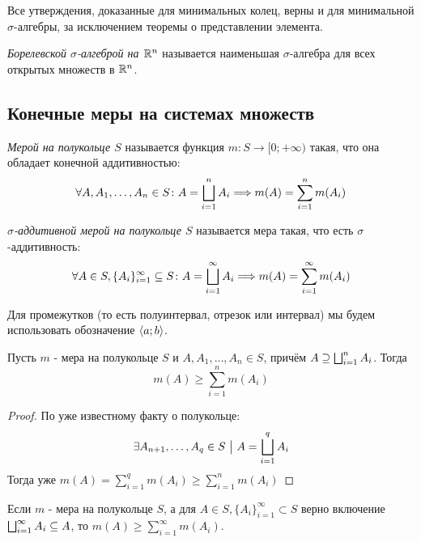 \begin{note}
	Все утверждения, доказанные для минимальных колец, верны и для минимальной $\sigma$-алгебры, за исключением теоремы о представлении элемента.
\end{note}

\begin{definition}
	\textit{Борелевской $\sigma$-алгеброй на $\mathbb{R}^n$} называется наименьшая $\sigma$-алгебра для всех открытых множеств в $\mathbb{R}^n$.
\end{definition}

\subsection{Конечные меры на системах множеств}

\begin{definition}
	\textit{Мерой на полукольце $S$} называется функция $m \colon S \to [0; +\infty)$ такая, что она обладает конечной аддитивностью:
	\[
		\forall A, A_1, \ldots, A_n \in S \colon A = \bigsqcup_{i = 1}^n A_i \Longrightarrow m(A) = \sum_{i = 1}^n m(A_i)
	\]
\end{definition}

\begin{definition}
	\textit{$\sigma$-аддитивной мерой на полукольце $S$} называется мера такая, что есть $\sigma$-аддитивность:
	\[
		\forall A \in S, \{A_i\}_{i = 1}^\infty \subseteq S \colon A = \bigsqcup_{i = 1}^\infty A_i \Longrightarrow m(A) = \sum_{i = 1}^\infty m(A_i)
	\]
\end{definition}

\begin{note}
	Для промежутков (то есть полуинтервал, отрезок или интервал) мы будем использовать обозначение $\left\langle a; b\right\rangle$.
\end{note}

\begin{lemma}
	Пусть $m$ - мера на полукольце $S$ и $A, A_1, \ldots, A_n \in S$, причём $A \supseteq \bigsqcup_{i = 1}^n A_i$. Тогда
	\[
		m(A) \ge \sum_{i = 1}^n m(A_i)
	\]
\end{lemma}

\begin{proof}
	По уже известному факту о полукольце:
	\[
		\exists A_{n + 1}, \ldots, A_q \in S \ \big|\  A = \bigsqcup_{i = 1}^q A_i
	\]
	Тогда уже $m(A) = \sum_{i = 1}^q m(A_i) \ge \sum_{i = 1}^n m(A_i)$
\end{proof}

\begin{corollary}
	Если $m$ - мера на полукольце $S$, а для $A \in S, \{A_i\}_{i = 1}^\infty \subset S$ верно включение $\bigsqcup_{i = 1}^\infty A_i \subseteq A$, то $m(A) \ge \sum_{i = 1}^\infty m(A_i)$.
\end{corollary}


